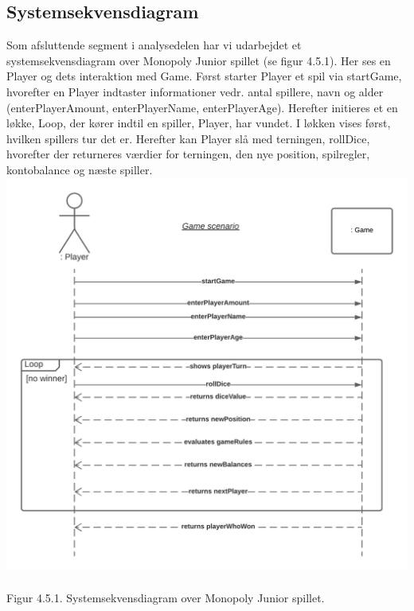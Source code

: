 \begin{flushleft}
\subsection{Systemsekvensdiagram}
    Som afsluttende segment i analysedelen har vi udarbejdet et systemsekvensdiagram over Monopoly Junior spillet (se figur 4.5.1). Her ses en Player og dets interaktion med Game. Først starter Player et spil via startGame, hvorefter en Player indtaster informationer vedr. antal spillere, navn og alder (enterPlayerAmount, enterPlayerName, enterPlayerAge). Herefter initieres et en løkke, Loop, der kører indtil en spiller, Player, har vundet. I løkken vises først, hvilken spillers tur det er. Herefter kan Player slå med terningen, rollDice, hvorefter der returneres værdier for terningen, den nye position, spilregler, kontobalance og næste spiller.
    \includegraphics[width=1\textwidth, height = 13 cm]{Report/figures/System sekvensdiagram.png}~\\
    Figur 4.5.1. Systemsekvensdiagram over Monopoly Junior spillet.

\end{flushleft}